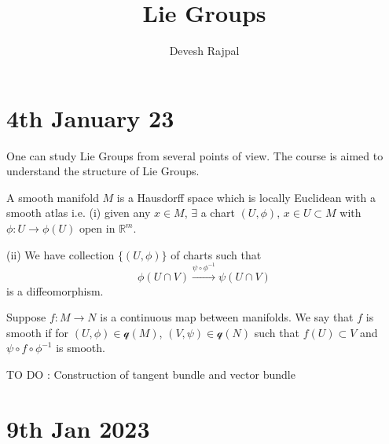 \documentclass[12pt,a4paper]{article}
\title{\LARGE Lie Groups}
\author{\large Devesh Rajpal}
\date{}
\theoremstyle{definition}
\theoremstyle{greenbox}
\newcommand{\R}{\mathbb{R}}
\begin{document}
    \maketitle
    \tableofcontents
    \section{4th January 23}
    One can study Lie Groups from several points of view. The course is aimed to understand the structure of Lie Groups. 
    \begin{defn}
        A smooth manifold $ M $ is a Hausdorff space which is locally Euclidean with a smooth atlas i.e. (i) given any $ x \in M $, $ \exists  $ a chart $ (U, \phi) , \, x \in U \subset M$ with  $ \phi : U \to \phi (U) $ open in $ \R^{m} $.


        (ii) We have collection $ \{(U, \phi)\} $ of charts such that 
        \[ \phi ( U \cap V) \xrightarrow{\psi \circ \phi^{-1}} \psi ( U \cap V)\]
        is  a diffeomorphism.
        
    \end{defn}

    Suppose $ f : M \to N $ is a continuous map between manifolds. We say that $  f  $ is smooth if for $ (U, \phi) \in \mathcal{q}(M) $, $ (V, \psi) \in \mathcal{q}(N) $ such that $ f(U) \subset V $ and $ \psi \circ f \circ  \phi^{-1} $ is smooth. 
    
    TO DO : Construction of tangent bundle and vector bundle

    \section{9th Jan 2023}
\end{document}
